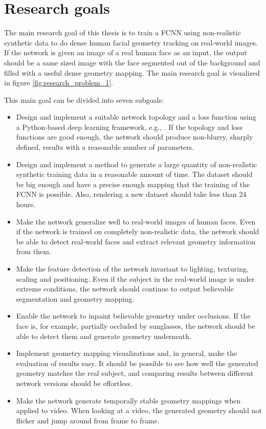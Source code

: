 \section{Research goals}

The main research goal of this thesis is to train a \acf{FCNN} using non-realistic synthetic data to do dense human facial geometry tracking on real-world images. If the network is given an image of a real human face as an input, the output should be a same sized image with the face segmented out of the background and filled with a useful dense geometry mapping. The main research goal is visualized in figure \ref{fig:research_problem_1}.

\newpage

This main goal can be divided into seven subgoals:

\begin{itemize}
    \item Design and implement a suitable network topology and a loss function using a Python-based deep learning framework, e.g., \textcite{cntk}. If the topology and loss functions are good enough, the network should produce non-blurry, sharply defined, results with a reasonable number of parameters.
    \item Design and implement a method to generate a large quantity of non-realistic synthetic training data in a reasonable amount of time. The dataset should be big enough and have a precise enough mapping that the training of the \ac{FCNN} is possible. Also, rendering a new dataset should take less than 24 hours.
    \item Make the network generalize well to real-world images of human faces. Even if the network is trained on completely non-realistic data, the network should be able to detect real-world faces and extract relevant geometry information from them.
    \item Make the feature detection of the network invariant to lighting, texturing, scaling and positioning. Even if the subject in the real-world image is under extreme conditions, the network should continue to output believable segmentation and geometry mapping.
    \item Enable the network to inpaint believable geometry under occlusions. If the face is, for example, partially occluded by sunglasses, the network should be able to detect them and generate geometry underneath.
    \item Implement geometry mapping visualizations and, in general, make the evaluation of results easy. It should be possible to see how well the generated geometry matches the real subject, and comparing results between different network versions should be effortless.
    \item Make the network generate temporally stable geometry mappings when applied to video. When looking at a video, the generated geometry should not flicker and jump around from frame to frame.
\end{itemize}

